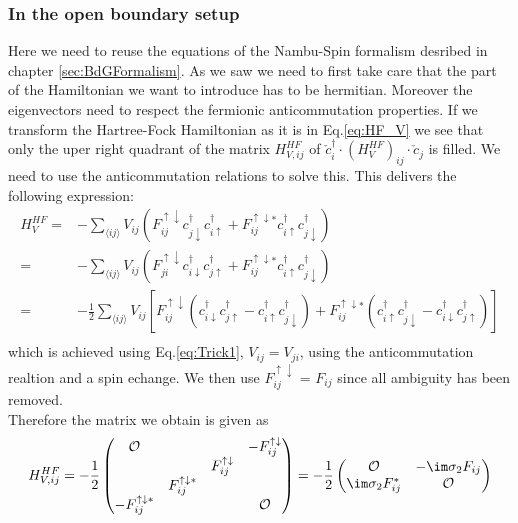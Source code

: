 \documentclass[../main.tex]{subfile}
\begin{document}
\subsubsection{In the open boundary setup}
Here we need to reuse the equations of the Nambu-Spin formalism desribed in chapter \ref{sec:BdGFormalism}. As we saw we need to first
take care that the part of the Hamiltonian we want to introduce has to be hermitian. Moreover the eigenvectors need to respect the fermionic
anticommutation properties.
If we transform the Hartree-Fock Hamiltonian as it is in Eq.\ref{eq:HF_V} we see that only the uper right quadrant of the matrix $H_{V,ij}^{HF}$ 
of $\check{c}_i^{\dagger} \cdot (H_{V}^{HF})_{ij}\cdot \check{c}_j $ is filled. We need to use the anticommutation relations to solve this.
This delivers the following expression:
\begin{equation}
    \begin{aligned}
    H_V^{HF} =& -\sum_{\langle ij\rangle} V_{ij} \left(F_{ij}^{\uparrow \downarrow} c_{j\downarrow}^{\dagger}c_{i\uparrow}^{\dagger} +
     F_{ij}^{\uparrow \downarrow\ast} c_{i\uparrow}^{\dagger}c_{j\downarrow}^{\dagger}\right)\\
     =& -\sum_{\langle ij\rangle} V_{ij} \left(F_{ji}^{\uparrow \downarrow} c_{i\downarrow}^{\dagger}c_{j\uparrow}^{\dagger} +
     F_{ij}^{\uparrow \downarrow\ast} c_{i\uparrow}^{\dagger}c_{j\downarrow}^{\dagger}\right)\\
     =& -\frac{1}{2}\sum_{\langle ij\rangle} V_{ij} \left[F_{ij}^{\uparrow \downarrow} \left(c_{i\downarrow}^{\dagger}c_{j\uparrow}^{\dagger} - c_{i\uparrow}^{\dagger}c_{j\downarrow}^{\dagger}\right)
     + F_{ij}^{\uparrow \downarrow\ast}  \left(c_{i\uparrow}^{\dagger}c_{j\downarrow}^{\dagger} - c_{i\downarrow}^{\dagger}c_{j\uparrow}^{\dagger}\right)\right]\\
    \end{aligned}
\end{equation} 
which is achieved using Eq.\ref{eq:Trick1}, $V_{ij} = {V_{ji}}$, 
using the anticommutation realtion and a spin echange. We then use $F_{ij}^{\uparrow \downarrow}$ = $F_{ij}$ since all ambiguity has been removed.\\
Therefore the matrix we obtain is given as
\begin{equation}\label{eq:H_V_DWave}
    H_{V,ij}^{HF} = -\frac{1}{2}\begin{pmatrix}
        \mathcal{O} & & & -F_{ij}^{\uparrow \downarrow}\\
         & & F_{ij}^{\uparrow \downarrow} & \\
         & F_{ij}^{\uparrow \downarrow\ast}& & \\
         -F_{ij}^{\uparrow \downarrow\ast} & & & \mathcal{O}\\
    \end{pmatrix} = -\frac{1}{2}\begin{pmatrix}
        \mathcal{O} & -\im \sigma_2 F_{ij}\\
        \im \sigma_2 F_{ij}^{\ast} & \mathcal{O}
    \end{pmatrix}
\end{equation}
\end{document}
